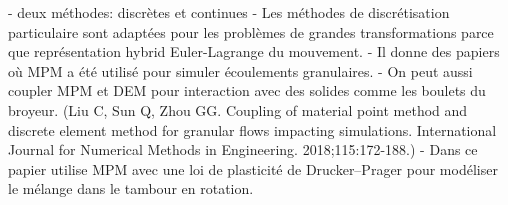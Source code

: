 - deux méthodes: discrètes et continues
- Les méthodes de discrétisation particulaire sont adaptées pour les problèmes de grandes transformations parce que représentation hybrid Euler-Lagrange du mouvement.
- Il donne des papiers où MPM a été utilisé pour simuler écoulements granulaires.
- On peut aussi coupler MPM et DEM pour interaction avec des solides comme les boulets du broyeur. (Liu C, Sun Q, Zhou GG. Coupling of material point method and discrete element method for granular flows impacting simulations. International Journal for Numerical Methods in Engineering. 2018;115:172-188.)
- Dans ce papier utilise MPM avec une loi de plasticité de Drucker–Prager pour modéliser le mélange dans le tambour en rotation.